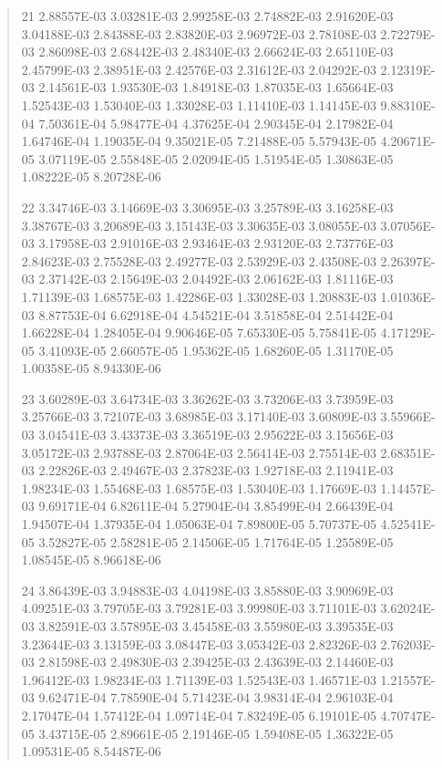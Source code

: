 \documentclass[letterpaper,10pt,english]{sphinxmanual}
\begin{document}
\begin{quote}
\begin{DUlineblock}{0em}
\item[] 21   2.88557E-03  3.03281E-03  2.99258E-03  2.74882E-03  2.91620E-03  3.04188E-03  2.84388E-03  2.83820E-03  2.96972E-03  2.78108E-03  2.72279E-03  2.86098E-03  2.68442E-03  2.48340E-03  2.66624E-03  2.65110E-03  2.45799E-03  2.38951E-03  2.42576E-03  2.31612E-03  2.04292E-03  2.12319E-03  2.14561E-03  1.93530E-03  1.84918E-03  1.87035E-03  1.65664E-03  1.52543E-03  1.53040E-03  1.33028E-03  1.11410E-03  1.14145E-03  9.88310E-04  7.50361E-04  5.98477E-04  4.37625E-04  2.90345E-04  2.17982E-04  1.64746E-04  1.19035E-04  9.35021E-05  7.21488E-05  5.57943E-05  4.20671E-05  3.07119E-05  2.55848E-05  2.02094E-05  1.51954E-05  1.30863E-05  1.08222E-05  8.20728E-06
\item[] 22   3.34746E-03  3.14669E-03  3.30695E-03  3.25789E-03  3.16258E-03  3.38767E-03  3.20689E-03  3.15143E-03  3.30635E-03  3.08055E-03  3.07056E-03  3.17958E-03  2.91016E-03  2.93464E-03  2.93120E-03  2.73776E-03  2.84623E-03  2.75528E-03  2.49277E-03  2.53929E-03  2.43508E-03  2.26397E-03  2.37142E-03  2.15649E-03  2.04492E-03  2.06162E-03  1.81116E-03  1.71139E-03  1.68575E-03  1.42286E-03  1.33028E-03  1.20883E-03  1.01036E-03  8.87753E-04  6.62918E-04  4.54521E-04  3.51858E-04  2.51442E-04  1.66228E-04  1.28405E-04  9.90646E-05  7.65330E-05  5.75841E-05  4.17129E-05  3.41093E-05  2.66057E-05  1.95362E-05  1.68260E-05  1.31170E-05  1.00358E-05  8.94330E-06
\item[] 23   3.60289E-03  3.64734E-03  3.36262E-03  3.73206E-03  3.73959E-03  3.25766E-03  3.72107E-03  3.68985E-03  3.17140E-03  3.60809E-03  3.55966E-03  3.04541E-03  3.43373E-03  3.36519E-03  2.95622E-03  3.15656E-03  3.05172E-03  2.93788E-03  2.87064E-03  2.56414E-03  2.75514E-03  2.68351E-03  2.22826E-03  2.49467E-03  2.37823E-03  1.92718E-03  2.11941E-03  1.98234E-03  1.55468E-03  1.68575E-03  1.53040E-03  1.17669E-03  1.14457E-03  9.69171E-04  6.82611E-04  5.27904E-04  3.85499E-04  2.66439E-04  1.94507E-04  1.37935E-04  1.05063E-04  7.89800E-05  5.70737E-05  4.52541E-05  3.52827E-05  2.58281E-05  2.14506E-05  1.71764E-05  1.25589E-05  1.08545E-05  8.96618E-06
\item[] 24   3.86439E-03  3.94883E-03  4.04198E-03  3.85880E-03  3.90969E-03  4.09251E-03  3.79705E-03  3.79281E-03  3.99980E-03  3.71101E-03  3.62024E-03  3.82591E-03  3.57895E-03  3.45458E-03  3.55980E-03  3.39535E-03  3.23644E-03  3.13159E-03  3.08447E-03  3.05342E-03  2.82326E-03  2.76203E-03  2.81598E-03  2.49830E-03  2.39425E-03  2.43639E-03  2.14460E-03  1.96412E-03  1.98234E-03  1.71139E-03  1.52543E-03  1.46571E-03  1.21557E-03  9.62471E-04  7.78590E-04  5.71423E-04  3.98314E-04  2.96103E-04  2.17047E-04  1.57412E-04  1.09714E-04  7.83249E-05  6.19101E-05  4.70747E-05  3.43715E-05  2.89661E-05  2.19146E-05  1.59408E-05  1.36322E-05  1.09531E-05  8.54487E-06

\end{DUlineblock}
\end{quote}
\end{document}
